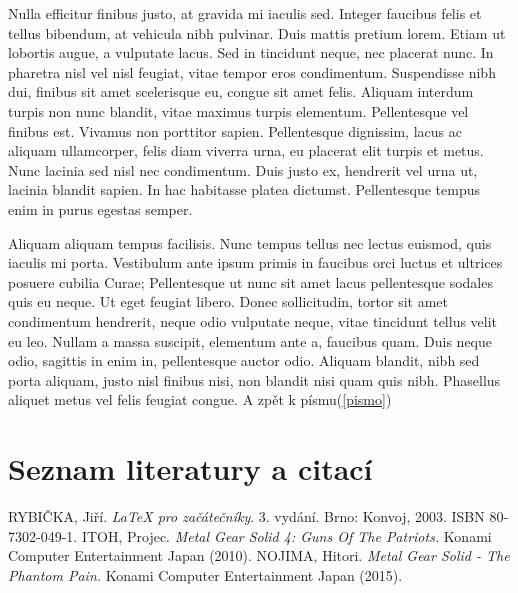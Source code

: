 \documentclass[10pt,a4paper]{article}
\begin{document}
Nulla efficitur finibus justo, at gravida mi iaculis sed. Integer faucibus felis et tellus bibendum, at vehicula nibh pulvinar. Duis mattis pretium lorem. Etiam ut lobortis augue, a vulputate lacus. Sed in tincidunt neque, nec placerat nunc. In pharetra nisl vel nisl feugiat, vitae tempor eros condimentum. Suspendisse nibh dui, finibus sit amet scelerisque eu, congue sit amet felis. Aliquam interdum turpis non nunc blandit, vitae maximus turpis elementum. Pellentesque vel finibus est. Vivamus non porttitor sapien. Pellentesque dignissim, lacus ac aliquam ullamcorper, felis diam viverra urna, eu placerat elit turpis et metus. Nunc lacinia sed nisl nec condimentum. Duis justo ex, hendrerit vel urna ut, lacinia blandit sapien. In hac habitasse platea dictumst. Pellentesque tempus enim in purus egestas semper.

Aliquam aliquam tempus facilisis. Nunc tempus tellus nec lectus euismod, quis iaculis mi porta. Vestibulum ante ipsum primis in faucibus orci luctus et ultrices posuere cubilia Curae; Pellentesque ut nunc sit amet lacus pellentesque sodales quis eu neque. Ut eget feugiat libero. Donec sollicitudin, tortor sit amet condimentum hendrerit, neque odio vulputate neque, vitae tincidunt tellus velit eu leo. Nullam a massa suscipit, elementum ante a, faucibus quam. Duis neque odio, sagittis in enim in, pellentesque auctor odio. Aliquam blandit, nibh sed porta aliquam, justo nisl finibus nisi, non blandit nisi quam quis nibh. Phasellus aliquet metus vel felis feugiat congue.
A zpět k písmu(\ref{pismo})
\newpage
\section{Seznam literatury a citací}
\begin{thebibliography}{9}
 RYBIČKA, Jiří.
\emph{\LaTeX{} pro začátečníky}. 3. vydání.
Brno: Konvoj, 2003. 
ISBN 80-7302-049-1.
 ITOH, Projec.
\emph{Metal Gear Solid 4: Guns Of The Patriots.}
Konami Computer Entertainment Japan (2010).
 NOJIMA, Hitori.
\emph{Metal Gear Solid - The Phantom Pain.}
Konami Computer Entertainment Japan (2015).
\end{thebibliography}
\end{document}
